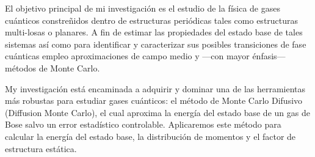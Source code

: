El objetivo principal de mi investigación es el estudio de la física de gases
cuánticos constreñidos dentro de estructuras periódicas tales como estructuras
multi-losas o planares. A fin de estimar las propiedades del estado base de
tales sistemas así como para identificar y caracterizar sus posibles
transiciones de fase cuánticas empleo aproximaciones de campo medio y ---con
mayor énfasis--- métodos de Monte Carlo.

My investigación está encaminada a adquirir y dominar una de las herramientas
más robustas para estudiar gases cuánticos: el método de Monte Carlo Difusivo
(Diffusion Monte Carlo), el cual aproxima la energía del estado base de un gas
de Bose salvo un error estadístico controlable. Aplicaremos este método para
calcular la energía del estado base, la distribución de momentos y el factor de
estructura estática.


